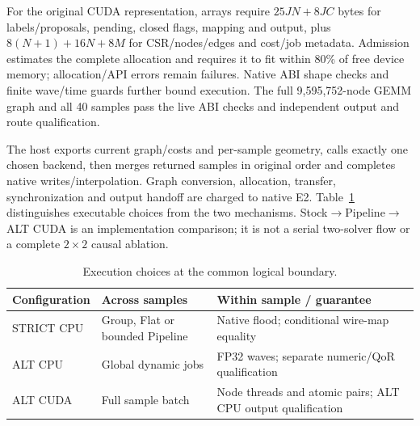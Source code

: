 For the original CUDA representation, arrays require $25JN+8JC$ bytes for labels/proposals, pending, closed flags, mapping and output, plus $8(N+1)+16N+8M$ for CSR/nodes/edges and cost/job metadata. Admission estimates the complete allocation and requires it to fit within 80\% of free device memory; allocation/API errors remain failures. Native ABI shape checks and finite wave/time guards further bound execution. The full 9,595,752-node GEMM graph and all 40 samples pass the live ABI checks and independent output and route qualification.

The host exports current graph/costs and per-sample geometry, calls exactly one chosen backend, then merges returned samples in original order and completes native writes/interpolation. Graph conversion, allocation, transfer, synchronization and output handoff are charged to native E2. Table~\ref{tab:configs} distinguishes executable choices from the two mechanisms. Stock$\to$Pipeline$\to$ALT CUDA is an implementation comparison; it is not a serial two-solver flow or a complete $2\times2$ causal ablation.

\begin{table}[t]\centering
\caption{Execution choices at the common logical boundary.}\label{tab:configs}
\begin{tabular}{lp{2.35cm}p{3.60cm}}\toprule
Configuration & Across samples & Within sample / guarantee\\\midrule
STRICT CPU & Group, Flat or bounded Pipeline & Native flood; conditional wire-map equality\\
ALT CPU & Global dynamic jobs & FP32 waves; separate numeric/QoR qualification\\
ALT CUDA & Full sample batch & Node threads and atomic pairs; ALT CPU output qualification\\\bottomrule
\end{tabular}\end{table}
